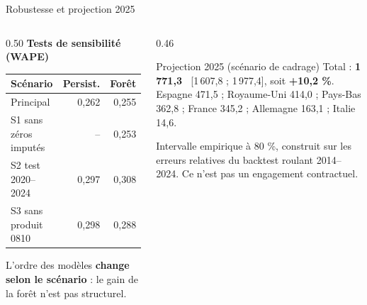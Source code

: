 \documentclass[aspectratio=169,10pt]{beamer}
\newcommand{\MUSD}{\,\text{M USD}}
\begin{document}
\begin{frame}{Robustesse et projection 2025}
  \begin{columns}[T,onlytextwidth]
    \begin{column}{0.50\textwidth}
      \textbf{Tests de sensibilité (WAPE)}
      \begin{tabular}{lrr}
        \toprule
        Scénario & Persist. & Forêt \\
        \midrule
        Principal & 0,262 & 0,255 \\
        S1 sans zéros imputés & -- & 0,253 \\
        S2 test 2020--2024 & 0,297 & 0,308 \\
        S3 sans produit 0810 & 0,298 & 0,288 \\
        \bottomrule
      \end{tabular}
      \vspace{0.4em}

      \small L'ordre des modèles \textbf{change selon le scénario} : le gain
      de la forêt n'est pas structurel.
    \end{column}
    \begin{column}{0.46\textwidth}
      \begin{block}{Projection 2025 (scénario de cadrage)}
        \small Total : \textbf{1\,771,3 \MUSD} [1\,607,8 ; 1\,977,4],
        soit \textbf{+10,2 \%}.\\[0.3em]
        Espagne 471,5 ; Royaume-Uni 414,0 ; Pays-Bas 362,8 ; France 345,2 ;
        Allemagne 163,1 ; Italie 14,6.
      \end{block}
      \vspace{0.3em}
      \scriptsize Intervalle empirique à 80 \%, construit sur les erreurs
      relatives du backtest roulant 2014--2024. Ce n'est pas un engagement
      contractuel.
    \end{column}
  \end{columns}
\end{frame}
\end{document}
